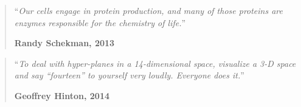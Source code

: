\thispagestyle{empty}
\vspace*{5cm}


\begin{quotation}
  \noindent ``\emph{Our cells engage in protein production, and many of those proteins are enzymes responsible for the chemistry of life.}''
  \begin{flushright}\textbf{Randy Schekman, 2013}\end{flushright}
\end{quotation}

\medskip

\begin{quotation}
  \noindent ``\emph{To deal with hyper-planes in a 14-dimensional space, visualize a 3-D space and say “fourteen” to yourself very loudly. Everyone does it.}''
  \begin{flushright}\textbf{Geoffrey Hinton, 2014}\end{flushright}
\end{quotation}